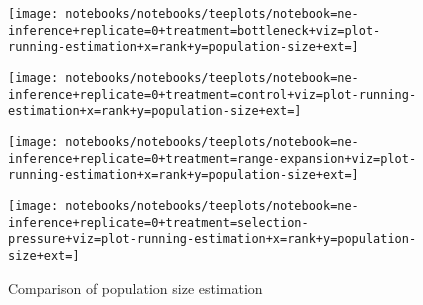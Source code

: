 \begin{sidewaysfigure}
  \centering
  \begin{minipage}{.8\textwidth} %

    \begin{minipage}{0.5\textwidth}
      \centering
      \texttt{[image: notebooks/notebooks/teeplots/notebook=ne-inference+replicate=0+treatment=bottleneck+viz=plot-running-estimation+x=rank+y=population-size+ext=]}
      \label{fig:ne-example-replicates:bottleneck}
    \end{minipage}%
    \begin{minipage}{0.5\textwidth}
      \centering
      \texttt{[image: notebooks/notebooks/teeplots/notebook=ne-inference+replicate=0+treatment=control+viz=plot-running-estimation+x=rank+y=population-size+ext=]}
      \label{fig:ne-example-replicates:control}
    \end{minipage}

    \vspace{1cm}

    \begin{minipage}{0.5\textwidth}
      \centering
      \texttt{[image: notebooks/notebooks/teeplots/notebook=ne-inference+replicate=0+treatment=range-expansion+viz=plot-running-estimation+x=rank+y=population-size+ext=]}
      \label{fig:ne-example-replicates:range_expansion}
    \end{minipage}%
    \begin{minipage}{0.5\textwidth}
      \centering
      \texttt{[image: notebooks/notebooks/teeplots/notebook=ne-inference+replicate=0+treatment=selection-pressure+viz=plot-running-estimation+x=rank+y=population-size+ext=]}
      \label{fig:ne-example-replicates:selection_pressure}
    \end{minipage}

  \end{minipage}
  \hfill %
  \begin{minipage}{.15\textwidth} %
    \caption{Comparison of population size estimation}
    \label{fig:ne-example-replicates}
  \end{minipage}

\end{sidewaysfigure}


%
%
%
